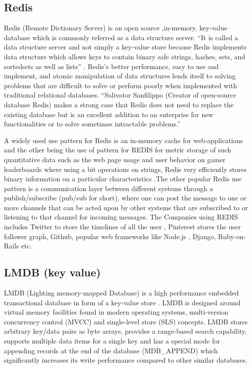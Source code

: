 \subsection{Redis}

     Redis (Remote Dictionary Server) is an open source ,in-memory,
     key-value database which is commonly referred as a data structure
     server. ``It is called a data structure server and not simply a
     key-value store because Redis implements data structure which
     allows keys to contain binary safe strings, hashes, sets, and
     sortedsets as well as lists'' \cite{redis-book-2011}.  Redis's
     better performance, easy to use and implement, and atomic
     manipulation of data structures lends itself to solving problems
     that are difficult to solve or perform poorly when implemented
     with traditional relational databases. ``Salivator
     Sanfilippo (Creator of open-source database Redis) makes a strong
     case that Redis does not need to replace the existing database
     but is an excellent addition to an enterprise for new
     functionalities or to solve sometimes intractable problems.''
     \cite{redis-book-2016}

     A widely used use pattern for Redis is an in-memory cache for
     web-applications and the other being the use of pattern for REDIS
     for metric storage of such quantitative data such as the web page
     usage and user behavior on gamer leaderboards where using a bit
     operations on strings, Redis very efficiently stores binary
     information on a particular characteristics
     \cite{redis-book-2016}.The other popular Redis use pattern is a
     communication layer between different systems through a
     publish/subscribe (pub/sub for short), where one can post the message
     to one or more channels that can be acted upon by other systems
     that are subscribed to or listening to that channel for incoming
     messages. The Companies using REDIS includes Twitter to store the
     timelines of all the user , Pinterest stores the user follower
     graph, Github, popular web frameworks like Node.js
     , Django, Ruby-on-Rails etc.

\subsection{LMDB (key value)}

     LMDB (Lighting memory-mapped Database) is a high performance
     embedded transactional database in form of a key-value store
     \cite{www-keyvalue}. LMDB is designed around virtual memory
     facilities found in modern operating systems, multi-version
     concurrency control (MVCC) and single-level store (SLS)
     concepts. LMDB stores arbitrary key/data pairs as byte arrays,
     provides a range-based search capability, supports multiple data
     items for a single key and has a special mode for appending
     records at the end of the database (MDB\_APPEND) which
     significantly increases its write performance compared to other
     similar databases.


